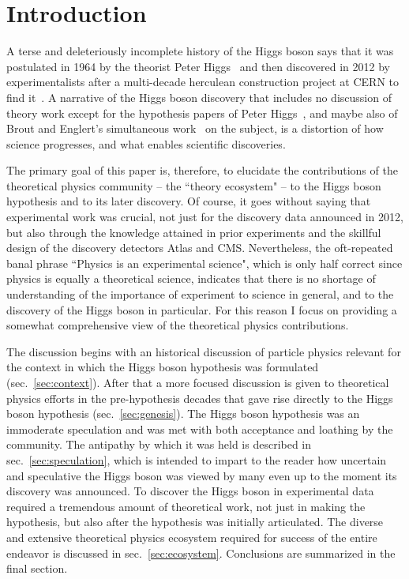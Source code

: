 \documentclass[letter,12pt]{article}
\begin{document}
\vfill\eject
\tableofcontents
\bigskip

\newpage

\section{Introduction}

A terse and deleteriously incomplete history of the Higgs boson says that it was postulated in 1964 by the theorist Peter Higgs~\cite{Higgs:1964pj} and then discovered in 2012 by experimentalists after a multi-decade herculean construction project at CERN to find it~\cite{Aad:2012tfa,Chatrchyan:2012xdj}. A narrative of the Higgs boson discovery that includes no discussion of theory work except for the hypothesis papers of Peter Higgs~\cite{Higgs:1964pj,Higgs:1964ia}, and maybe also of Brout and Englert's simultaneous work~\cite{Englert:1964et} on the subject, is a distortion of how science progresses, and what enables scientific discoveries.

The primary goal of this paper is, therefore, to elucidate the contributions of the theoretical physics community -- the ``theory ecosystem" -- to the Higgs boson hypothesis and to its later discovery. Of course, it goes without saying that experimental work was crucial, not just for the discovery data announced in 2012, but also through the knowledge attained in prior experiments and the skillful design of the discovery detectors Atlas and CMS. Nevertheless, the oft-repeated banal phrase ``Physics is an experimental science", which is only half correct since physics is equally a theoretical science,  indicates that there is no shortage of understanding of the importance of experiment to science in general, and to the discovery of the Higgs boson in particular. For this reason I focus on providing a somewhat comprehensive view of the theoretical physics contributions.

The discussion begins with an historical discussion of particle physics relevant for the context in which the Higgs boson hypothesis was formulated (sec.~\ref{sec:context}). After that a more focused discussion is given to theoretical physics efforts in the pre-hypothesis decades that gave rise directly to the Higgs boson hypothesis (sec.~\ref{sec:genesis}). The Higgs boson hypothesis was an immoderate speculation and was met with both acceptance and loathing by the community. The antipathy by which it was held is described in sec.~\ref{sec:speculation}, which is intended to impart to the reader  how uncertain and speculative the Higgs boson was viewed by many even up to the moment its discovery was announced. To discover the Higgs boson in experimental data required a tremendous amount of theoretical work, not just in making the hypothesis, but also after the hypothesis was initially articulated. The diverse and extensive theoretical physics ecosystem required for success of the entire endeavor is discussed in sec.~\ref{sec:ecosystem}. Conclusions are summarized in the final section.
\end{document}

